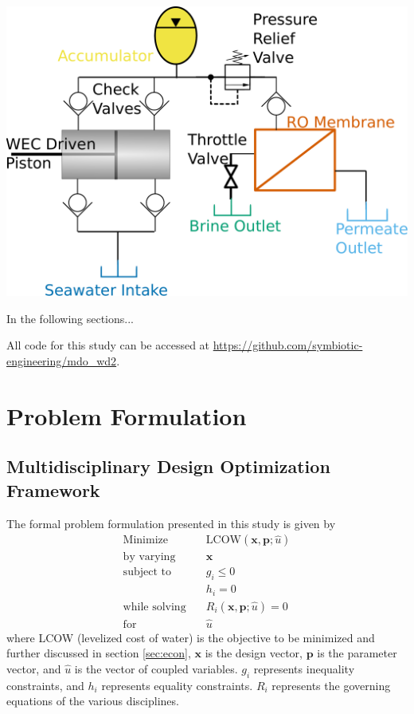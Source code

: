 \documentclass[twocolumn,10pt]{asme2e}
\begin{document}
\begin{center}
    \includegraphics[width=\linewidth]{../figs/hydraulic_circuit.pdf}
    \label{fig:hydraulics}
\end{center}

In the following sections...

All code for this study can be accessed at \href{https://github.com/symbiotic-engineering/mdo_wd2}{https://github.com/symbiotic-engineering/mdo\_wd2}.

\section{Problem Formulation}
\subsection{Multidisciplinary Design Optimization Framework}
The formal problem formulation presented in this study is given by
\begin{align*} 
    \text{Minimize} \quad & \text{LCOW}(\mathbf{x},\mathbf{p}; \hat{u})  \\
    \text{by varying} \quad & \mathbf{x}\\
    \text{subject to } \quad &  g_i \leq 0 \\
                             &  h_i = 0 \\
    \text{while solving} \quad & R_i(\mathbf{x},\mathbf{p};\hat{u}) = 0\\
    \text{for } \quad & \hat{u}
    \label{eq:problem}
\end{align*}
\noindent where LCOW (levelized cost of water) is the objective to be minimized and further discussed in section \ref{sec:econ}, $\mathbf{x}$ is the design vector, $\mathbf{p}$ is the parameter vector, and $\hat{u}$ is the vector of coupled variables. $g_i$ represents inequality constraints, and $h_i$ represents equality constraints. $R_i$ represents the governing equations of the various disciplines. 
\end{document}

